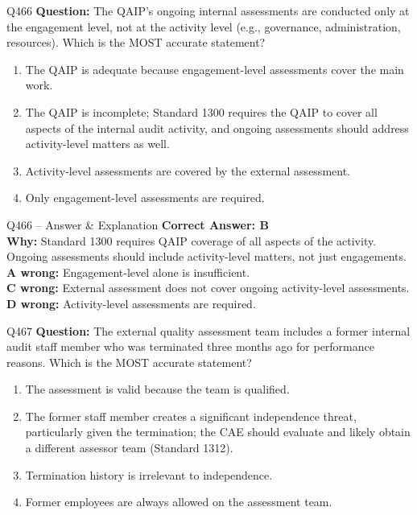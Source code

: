 \documentclass[aspectratio=169,10pt]{beamer}
\begin{document}
	\begin{frame}[t]{Q466}
		\small
		\textbf{Question:} The QAIP's ongoing internal assessments are conducted only at the engagement level, not at the activity level (e.g., governance, administration, resources). Which is the MOST accurate statement?
		\begin{enumerate}[label=\Alph*.,itemsep=1pt,topsep=2pt]
			\item The QAIP is adequate because engagement-level assessments cover the main work.
			\item The QAIP is incomplete; Standard 1300 requires the QAIP to cover all aspects of the internal audit activity, and ongoing assessments should address activity-level matters as well.
			\item Activity-level assessments are covered by the external assessment.
			\item Only engagement-level assessments are required.
		\end{enumerate}
	\end{frame}
	
	\begin{frame}[t]{Q466 -- Answer \& Explanation}
		\small
		\textbf{Correct Answer: B} \\[4pt]
		\textbf{Why:} Standard 1300 requires QAIP coverage of all aspects of the activity. Ongoing assessments should include activity-level matters, not just engagements. \\[4pt]
		\textbf{A wrong:} Engagement-level alone is insufficient. \\[2pt]
		\textbf{C wrong:} External assessment does not cover ongoing activity-level assessments. \\[2pt]
		\textbf{D wrong:} Activity-level assessments are required.
	\end{frame}
	
	\begin{frame}[t]{Q467}
		\small
		\textbf{Question:} The external quality assessment team includes a former internal audit staff member who was terminated three months ago for performance reasons. Which is the MOST accurate statement?
		\begin{enumerate}[label=\Alph*.,itemsep=1pt,topsep=2pt]
			\item The assessment is valid because the team is qualified.
			\item The former staff member creates a significant independence threat, particularly given the termination; the CAE should evaluate and likely obtain a different assessor team (Standard 1312).
			\item Termination history is irrelevant to independence.
			\item Former employees are always allowed on the assessment team.
		\end{enumerate}
	\end{frame}
	
\end{document}
